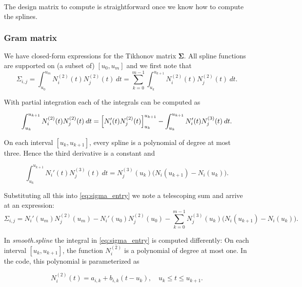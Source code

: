 \documentclass[a4paper]{scrartcl}
\newcommand{\mat}[1]{\ensuremath{\bm{#1}}}
\newcommand\dd{\ensuremath{\:d}}
\begin{document}
The design matrix to compute is straightforward once we know how to compute the splines.


\subsubsection{Gram matrix}

We have closed-form expressions for the Tikhonov matrix $\mat\Sigma$.
All spline functions are supported on (a subset of) $[u_0, u_m]$ and we first note that
\begin{equation}
    \label{eq:sigma_entry}
    \Sigma_{i,j}
    = \int_{u_0}^{u_m} N_i^{(2)}(t) N_j^{(2)}(t) \dd t
    = \sum_{k = 0}^{m - 1} \int_{u_k}^{u_{k+1}} N_i^{(2)}(t) N_j^{(2)}(t) \dd t.
\end{equation}

With partial integration each of the integrals can be computed as

\begin{equation*}
    \int_{u_k}^{u_{k+1}} N_i^{(2)}(t) N_j^{(2)}(t) \dd t
    = \Bigl[ N_i'(t) N_j^{(2)}(t) \Bigr]_{u_k}^{u_{k+1}} -
    \int_{u_k}^{u_{k+1}} N_i'(t) N_j^{(3)}(t) \dd t.
\end{equation*}

On each interval $[u_k, u_{k+1}]$, every spline is a polynomial of degree at most three.
Hence the third derivative is a constant and

\begin{equation*}
    \int_{u_k}^{u_{k+1}} N_i'(t) N_j^{(3)}(t) \dd t
    = N_j^{(3)}(u_k) \bigl(N_i(u_{k+1}) - N_i(u_k)\bigr).
\end{equation*}

Substituting all this into \cref{eq:sigma_entry} we note a telescoping sum and arrive at an expression:
\begin{equation*}
    \Sigma_{i,j}
    = N_i'(u_m) N_j^{(2)}(u_m) - N_i'(u_0) N_j^{(2)}(u_0) 
    - \sum_{k = 0}^{m - 1} N_j^{(3)}(u_k) \bigl(N_i(u_{k+1}) - N_i(u_k)\bigr).
\end{equation*}

In \textit{smooth.spline} the integral in \cref{eq:sigma_entry} is computed differently:
On each interval $[u_k, u_{k+1}]$, the function $N_i^{(2)}$ is a polynomial of degree at most one.
In the code, this polynomial is parameterized as

\begin{equation*}
    N_i^{(2)}(t) 
    = a_{i,k} + b_{i,k} (t - u_k), 
    \quad u_k\leq t\leq u_{k+1}.
\end{equation*}
\end{document}
